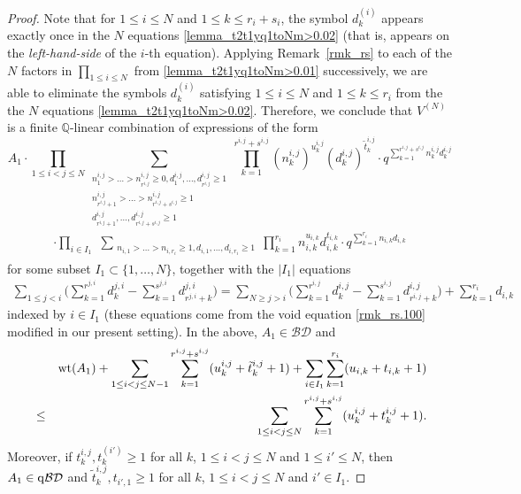 \documentclass[12pt, reqno]{amsart}
\theoremstyle{definition}
\theoremstyle{remark}
\numberwithin{equation}{section}
\newcommand{\BD}{\mathcal {BD}}
\newcommand{\Q}{ \mathbb Q }
\newcommand{\qBD}{{\rm q}{\mathcal {BD}}}
\newcommand{\w}{\tilde}
\numberwithin{equation}{section}
\begin{document}
\begin{proof}
Note that for $1 \le i \le N$ and $1 \le k \le r_i+s_i$, 
the symbol $d_{k}^{(i)}$ appears exactly once in the $N$ equations 
\eqref{lemma_t2t1yq1toNm>0.02} (that is, 
appears on the {\it left-hand-side} of the $i$-th equation). 
Applying Remark~\ref{rmk_rs} to each of the $N$ factors in 
$\displaystyle{\prod_{1 \le i \le N}}$ from 
\eqref{lemma_t2t1yq1toNm>0.01} successively, 
we are able to eliminate the symbols $d_{k}^{(i)}$ 
satisfying $1 \le i \le N$ and $1 \le k \le r_i$ 
from the the $N$ equations \eqref{lemma_t2t1yq1toNm>0.02}.
Therefore, we conclude that $V^{(N)}$ is 
a finite $\Q$-linear combination of expressions of the form 
$$
A_1 \cdot \prod_{1 \le i < j \le N}
\sum_{\substack{n_1^{i,j} > \ldots > n_{r^{i,j}}^{i,j} \ge 0, 
    d_1^{i,j}, \ldots, d_{r^{i,j}}^{i,j} \ge 1\\
    n_{r^{i,j}+1}^{i,j} > \ldots > n_{r^{i,j}+s^{i,j}}^{i,j} \ge 1\\
    d_{r^{i,j}+1}^{i,j}, \ldots, d_{r^{i,j}+s^{i,j}}^{i,j} \ge 1}}
  \prod_{k=1}^{r^{i,j}+s^{i,j}} (n_k^{i,j})^{u_k^{i,j}}
    (d_k^{i,j})^{\w t_k^{i,j}} 
\cdot q^{\sum_{k=1}^{r^{i,j}+s^{i,j}} n_k^{i,j} d_k^{i,j}}
$$
\begin{eqnarray}    \label{lemma_t2t1yq1toNm>0.1}
\cdot \prod_{i \in I_1} \,\,
\sum_{\substack{n_{i,1} > \ldots > n_{i, r_i} \ge 1, 
    d_{i,1}, \ldots, d_{i, r_i} \ge 1}}
\prod_{k=1}^{r_i} n_{i,k}^{u_{i,k}} d_{i,k}^{t_{i,k}} 
\cdot q^{\sum_{k=1}^{r_i} n_{i,k} d_{i,k}}
\end{eqnarray}
for some subset $I_1 \subset \{1, \ldots, N\}$,
together with the $|I_1|$ equations
\begin{eqnarray}    \label{lemma_t2t1yq1toNm>0.2}
\sum_{1 \le j < i} \bigg (\sum_{k=1}^{r^{j,i}} d_k^{j,i} 
    - \sum_{k=1}^{s^{j,i}} d_{r^{j,i}+k}^{j,i} \bigg )
= \sum_{N \ge j > i} \bigg (\sum_{k=1}^{r^{i,j}} d_k^{i,j} 
    - \sum_{k=1}^{s^{i,j}} d_{r^{i,j}+k}^{i,j} \bigg )
  + \sum_{k=1}^{r_i} d_{i,k}
\end{eqnarray}
indexed by $i \in I_1$ (these equations come from the void equation 
\eqref{rmk_rs.100} modified in our present setting). 
In the above, $A_1 \in \BD$ and 
\begin{eqnarray*}
& &{\rm wt}(A_1) 
   + \sum_{1 \le i < j \le N-1} \sum_{k=1}^{r^{i,j}+s^{i,j}} 
   (u_k^{i,j} + \w t_k^{i,j} + 1)
   + \sum_{i \in I_1} \sum_{k=1}^{r_i} (u_{i,k} + t_{i,k} + 1)  \\
&\le&\sum_{1 \le i < j \le N} \sum_{k=1}^{r^{i,j}+s^{i,j}} 
   (u_k^{i,j} + t_k^{i,j} + 1).
\end{eqnarray*}
Moreover, if $t_k^{i,j}, t_k^{(i')} \ge 1$ for all $k$, 
$1 \le i < j \le N$ and $1 \le i' \le N$,
then $A_1 \in \qBD$ and $\w t_k^{i,j}, t_{i',1} \ge 1$ 
for all $k$, $1 \le i < j \le N$ and $i' \in I_1$. 


\end{proof}
\end{document}

